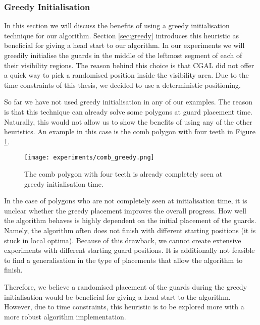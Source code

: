 \subsubsection{Greedy Initialisation}
In this section we will discuss the benefits of using a greedy initialisation technique for our algorithm. Section \ref{sec:greedy} introduces this heuristic as beneficial for giving a head start to our algorithm. In our experiments we will greedily initialise the guards in the middle of the leftmost segment of each of their visibility regions. The reason behind this choice is that CGAL did not offer a quick way to pick a randomised position inside the visibility area. Due to the time constraints of this thesis, we decided to use a deterministic positioning.

So far we have not used greedy initialisation in any of our examples. The reason is that this technique can already solve some polygons at guard placement time. Naturally, this would not allow us to show the benefits of using any of the other heuristics. An example in this case is the comb polygon with four teeth in Figure \ref{fig:comb_greedy}.

\begin{figure}[h!]
    \centering
    \texttt{[image: experiments/comb\_greedy.png]}
    \caption{The comb polygon with four teeth is already completely seen at greedy initialisation time.}
    \label{fig:comb_greedy}
\end{figure}

In the case of polygons who are not completely seen at initialisation time, it is unclear whether the greedy placement improves the overall progress. How well the algorithm behaves is highly dependent on the initial placement of the guards. Namely, the algorithm often does not finish with different starting positions (it is stuck in local optima). Because of this drawback, we cannot create extensive experiments with different starting guard positions. It is additionally not feasible to find a generalisation in the type of placements that allow the algorithm to finish.

Therefore, we believe a randomised placement of the guards during the greedy initialisation would be beneficial for giving a head start to the algorithm. However, due to time constraints, this heuristic is to be explored more with a more robust algorithm implementation.

